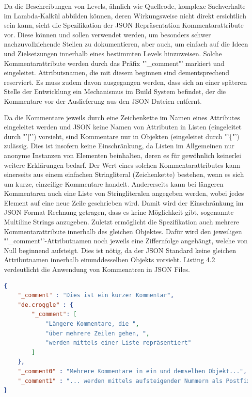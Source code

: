 Da die Beschreibungen von Levels, ähnlich wie Quellcode, komplexe Sachverhalte im Lambda-Kalkül abbilden können, deren Wirkungsweise nicht direkt ersichtlich sein kann,
sieht die Spezifikation der JSON Repräsentation Kommentarattribute vor.
Diese können und sollen verwendet werden, um besonders schwer nachzuvollziehende Stellen zu dokumentieren, aber auch, um einfach auf die Ideen und Zielsetzungen innerhalb eines bestimmten Levels hinzuweisen.
Solche Kommentarattribute werden durch das Präfix "'\_comment"' markiert und eingeleitet.
Attributsnamen, die mit diesem beginnen sind dementsprechend reserviert.
Es muss zudem davon ausgegangen werden, dass sich an einer späteren Stelle der Entwicklung ein Mechanismus im Build System befindet, der die Kommentare vor der Auslieferung aus den JSON Dateien entfernt.

Da die Kommentare jeweils durch eine Zeichenkette im Namen eines Attributes eingeleitet werden und JSON keine Namen von Attributen in Listen (eingeleitet durch "'["') vorsieht, sind Kommentare nur in Objekten (eingeleitet durch "'\{"') zulässig.
Dies ist insofern keine Einschränkung, da Listen im Allgemeinen nur anonyme Instanzen von Elementen beinhalten, deren es für gewöhnlich keinerlei weitere Erklärungen bedarf.
Der Wert eines solchen Kommentarattributes kann einerseits aus einem einfachen Stringliteral (Zeichenkette) bestehen, wenn es sich um kurze, einzeilige Kommentare handelt.
Andererseits kann bei längeren Kommentaren auch eine Liste von Stringliteralen angegeben werden, wobei jedes Element auf eine neue Zeile geschrieben wird.
Damit wird der Einschränkung im JSON Format Rechnung getragen, dass es keine Möglichkeit gibt, sogenannte Multiline Strings anzugeben.
Zuletzt ermöglicht die Spezifikation auch mehrere Kommentarattribute innerhalb des gleichen Objektes.
Dafür wird den jeweiligen "'\_comment"'-Attributnamen noch jeweils eine Ziffernfolge angehängt, welche von Null beginnend aufsteigt.
Dies ist nötig, da der JSON Standard keine gleichen Attributnamen innerhalb einunddesselben Objekts vorsieht.
Listing 4.2 verdeutlicht die Anwendung von Kommenatren in JSON Files.
\begin{lstlisting}[language=json,caption={Kommentare in einer JSON Datei}]
{
	"_comment" : "Dies ist ein kurzer Kommentar",
	"de.croggle" : {
		"_comment": [
			"Längere Kommentare, die ",
			"über mehrere Zeilen gehen, ",
			"werden mittels einer Liste repräsentiert"
		]
	},
	"_comment0" : "Mehrere Kommentare in ein und demselben Objekt...",
	"_comment1" : "... werden mittels aufsteigender Nummern als Postfix unterschieden"
}
\end{lstlisting}

